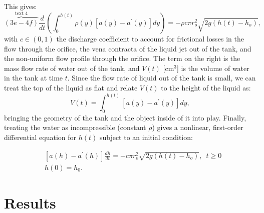 \documentclass[openacc]{rsproca_new}%
\begin{document}
This gives:
\begin{equation}
\overbrace{(3e - 4f)}^{\text{text 4}}
	\frac{d}{dt} \left ( \int_0^{h(t)} \rho(y) [a(y) - a^\prime(y)]dy \right) = - \rho c \pi r_o^2 \sqrt{2 g(h(t)-h_o)},
\end{equation}
with $c\in(0,1)$ the discharge coefficient \cite{lienhard1984velocity,hicks2014determining,wadhwa2021study,teoman2022discharge} to account for frictional losses in the flow through the orifice, the vena contracta of the liquid jet out of the tank, and the non-uniform flow profile through the orifice. The term on the right is the mass flow rate of water out of the tank, and $V(t)$ [cm$^3$] is the volume of water in the tank at time $t$. 
Since the flow rate of liquid out of the tank is small, we can treat the top of the liquid as flat and relate $V(t)$ to the height of the liquid as: 
\begin{equation}
	V(t)=\int_0^{h(t)} [a(y) - a^\prime(y)]dy,
\end{equation}
bringing the geometry of the tank and the object inside of it into play. Finally, treating the water as incompressible (constant $\rho$) gives a nonlinear, first-order differential equation for $h(t)$ subject to an initial condition:

\begin{align}
& [a(h)-a^\prime(h)]\frac{dh}{dt}= -c \pi r_o^2 \sqrt{2g (h(t)-h_o)}, \,\,\, t \geq 0 \\
& h(0)=h_0.
\end{align}


\section{Results}
\end{document}
